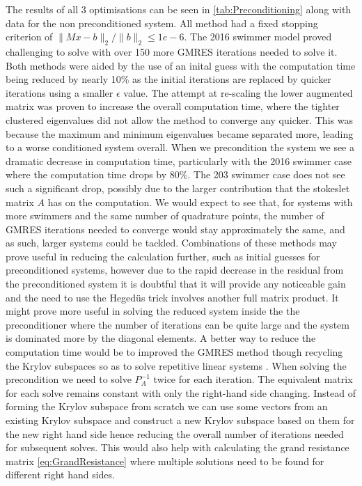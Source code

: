 The results of all 3 optimisations can be seen in \cref{tab:Preconditioning} along with data for the non preconditioned system. All method had a fixed stopping criterion of $\lVert Mx-b \rVert_2/\lVert b \rVert_2 \leq 1e-6$. The 2016 swimmer model proved challenging to solve with over 150 more GMRES iterations needed to solve it. Both methods were aided by the use of an inital guess with the computation time being reduced by nearly 10\% as the initial iterations are replaced by quicker iterations using a smaller $\epsilon$ value. The attempt at re-scaling the lower augmented matrix was proven to increase the overall computation time, where the tighter clustered eigenvalues did not allow the method to converge any quicker. This was because the maximum and minimum eigenvalues became separated more, leading to a worse conditioned system overall. When we precondition the system we see a dramatic decrease in computation time, particularly with the 2016 swimmer case where the computation time drops by 80\%. The 203 swimmer case does not see such a significant drop, possibly due to the larger contribution that the stokeslet matrix $A$ has on the computation. We would expect to see that, for systems with more swimmers and the same number of quadrature points, the number of GMRES iterations needed to converge would stay approximately the same, and as such, larger systems could be tackled. Combinations of these methods may prove useful in reducing the calculation further, such as initial guesses for preconditioned systems, however due to the rapid decrease in the residual from the preconditioned system it is doubtful that it will provide any noticeable gain and the need to use the Heged{\"u}s trick involves another full matrix product. It might prove more useful in solving the reduced system inside the the preconditioner where the number of iterations can be quite large and the system is dominated more by the diagonal elements. A better way to reduce the computation time would be to improved the GMRES method though recycling the Krylov subspaces so as to solve repetitive linear systems \cite{Parks2006RecyclingSystems,Rostami2019FastBiofluids}. When solving the precondition we need to solve $P_A^{-1}$ twice for each iteration. The equivalent matrix for each solve remains constant with only the right-hand side changing. Instead of forming the Krylov subspace from scratch we can use some vectors from an existing Krylov subspace and construct a new Krylov subspace based on them for the new right hand side hence reducing the overall number of iterations needed for subsequent solves. This would also help with calculating the grand resistance matrix \cref{eq:GrandResistance} where multiple solutions need to be found for different right hand sides.



